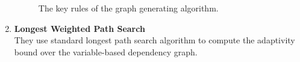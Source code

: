 \begin{enumerate}
\begin{figure}
{
}
    \caption{The key rules of the graph generating algorithm.}
    \label{fig:prework-static_alg2}
\end{figure}
%
\item \textbf{Longest Weighted Path Search}
\\
They use standard longest path search algorithm to compute the adaptivity bound over the variable-based dependency graph.
\end{enumerate}

